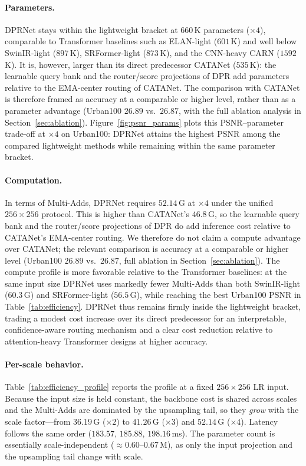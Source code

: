 \paragraph{Parameters.}
DPRNet stays within the lightweight bracket at $660$\,K parameters ($\times4$),
comparable to Transformer baselines such as ELAN-light ($601$\,K) and well below
SwinIR-light ($897$\,K), SRFormer-light ($873$\,K), and the CNN-heavy CARN
($1592$\,K). It is, however, larger than its direct predecessor CATANet ($535$\,K):
the learnable query bank and the router/score projections of DPR add parameters
relative to the EMA-center routing of CATANet. The comparison with CATANet is
therefore framed as accuracy at a comparable or higher level, rather than as a
parameter advantage (Urban100 $26.89$ vs.\ $26.87$, with the full ablation analysis in
Section~\ref{sec:ablation}). Figure~\ref{fig:psnr_params} plots this PSNR--parameter
trade-off at $\times4$ on Urban100: DPRNet attains the highest PSNR among the
compared lightweight methods while remaining within the same parameter bracket.

\paragraph{Computation.}
In terms of Multi-Adds, DPRNet requires $52.14$\,G at $\times4$ under the unified
$256{\times}256$ protocol. This is higher than CATANet's $46.8$\,G, so the learnable
query bank and the router/score projections of DPR do add inference cost relative to
CATANet's EMA-center routing. We therefore do not claim a compute advantage over CATANet;
the relevant comparison is accuracy at a comparable or higher level (Urban100
$26.89$ vs.\ $26.87$, full ablation in Section~\ref{sec:ablation}). The compute profile
is more favorable relative to the Transformer baselines: at the same input size
DPRNet uses markedly fewer Multi-Adds than both SwinIR-light ($60.3$\,G) and
SRFormer-light ($56.5$\,G), while reaching the best Urban100 PSNR in
Table~\ref{tab:efficiency}. DPRNet thus remains firmly inside the lightweight
bracket, trading a modest cost increase over its direct predecessor for an
interpretable, confidence-aware routing mechanism and a clear cost reduction
relative to attention-heavy Transformer designs at higher accuracy.

\paragraph{Per-scale behavior.}
Table~\ref{tab:efficiency_profile} reports the profile at a fixed $256{\times}256$ LR
input. Because the input size is held constant, the backbone cost is shared across scales
and the Multi-Adds are dominated by the upsampling tail, so they \emph{grow} with the scale
factor---from $36.19$\,G ($\times2$) to $41.26$\,G ($\times3$) and $52.14$\,G
($\times4$). Latency follows the same order ($183.57$, $185.88$, $198.16$\,ms). The
parameter count is essentially scale-independent ($\approx0.60$--$0.67$\,M), as only the
input projection and the upsampling tail change with scale.

